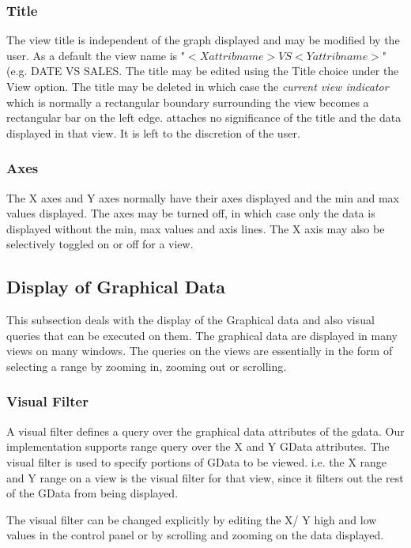 \subsubsection{Title}

The view title is independent of the graph displayed and may be
modified by the user. As a default the view name is "$<X attrib name >
VS <Y attrib name >$" (e.g. DATE VS SALES. The title may be edited
using the Title choice under the View option.  The title may be
deleted in which case the {\em current view indicator} which is
normally a rectangular boundary surrounding the view becomes a
rectangular bar on the left edge. \Devise attaches no significance of
the title and the data displayed in that view. It is left to the
discretion of the user.

\subsubsection{Axes}

The X axes and Y axes normally have their axes displayed and the min
and max values displayed. The axes may be turned off, in which case
only the data is displayed without the min, max values and axis
lines. The X axis may also be selectively toggled on or off for a
view.

\subsection{Display of Graphical Data}

This subsection deals with the display of the Graphical data and also
visual queries that can be executed on them. The graphical data are
displayed in many views on many windows. The queries on the views are
essentially in the form of selecting a range by zooming in, zooming
out or scrolling.

\subsubsection{Visual Filter}

A visual filter defines a query over the graphical data attributes of
the gdata. Our implementation supports range query over the X and Y
GData attributes. The visual filter is used to specify portions of
GData to be viewed. i.e. the X range and Y range on a view is the
visual filter for that view, since it filters out the rest of the
GData from being displayed.

The visual filter can be changed explicitly by editing the X/ Y high
and low values in the control panel or by scrolling and zooming on the
data displayed.

